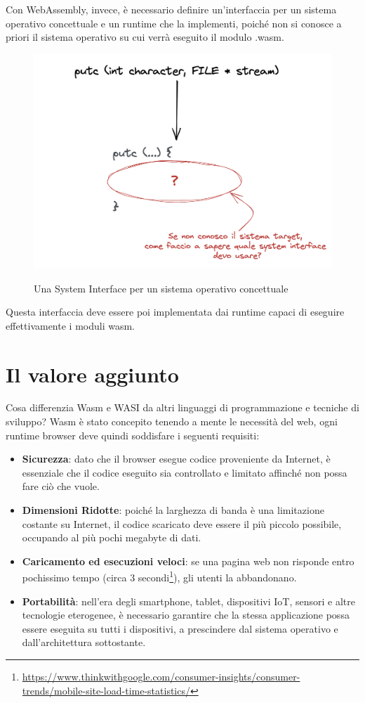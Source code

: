 Con WebAssembly, invece, è necessario definire un'interfaccia per un sistema operativo concettuale e un runtime che la
implementi, poiché non si conosce a priori il sistema operativo su cui verrà eseguito il modulo .wasm.
\begin{figure}[H]
    \centering
    \captionsetup{justification=centering}
    \includegraphics[width=15cm]{./chapters/1.introduction/images/5a.wasi_sys_interface.png}
    \label{system-interface-conceptual-sys}
    \caption{Una System Interface per un sistema operativo concettuale}
\end{figure}
Questa interfaccia deve essere poi implementata dai runtime capaci di eseguire effettivamente i moduli wasm.

\section{Il valore aggiunto}
Cosa differenzia Wasm e WASI da altri linguaggi di programmazione e tecniche di sviluppo? Wasm è stato concepito tenendo
a mente le necessità del web, ogni runtime browser deve quindi soddisfare i seguenti requisiti:

\begin{itemize}
    \item \textbf{Sicurezza}: dato che il browser esegue codice proveniente da Internet, è essenziale che il codice
    eseguito sia controllato e limitato affinché non possa fare ciò che vuole.
    \item \textbf{Dimensioni Ridotte}: poiché la larghezza di banda è una limitazione costante su Internet, il codice
    scaricato deve essere il più piccolo possibile, occupando al più pochi megabyte di dati.
    \item \textbf{Caricamento ed esecuzioni veloci}: se una pagina web non risponde entro pochissimo tempo (circa 3
    secondi\footnote{\url{https://www.thinkwithgoogle.com/consumer-insights/consumer-trends/mobile-site-load-time-statistics/}}),
    gli utenti la abbandonano.
    \item \textbf{Portabilità}: nell'era degli smartphone, tablet, dispositivi IoT, sensori e altre tecnologie
    eterogenee, è necessario garantire che la stessa applicazione possa essere eseguita su tutti i dispositivi, a
    prescindere dal sistema operativo e dall'architettura sottostante.
\end{itemize}

